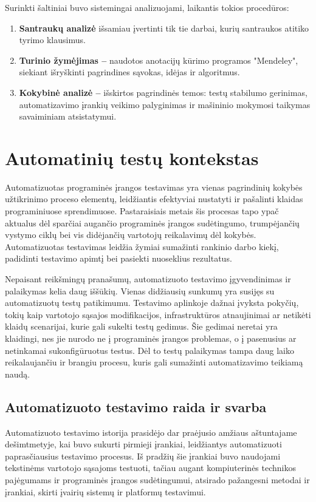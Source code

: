 \documentclass[
]{VUMIFPSkursinis}
\begin{document}
Surinkti šaltiniai buvo sistemingai analizuojami, laikantis tokios procedūros:

\begin{enumerate}
    \item \textbf{Santraukų analizė}  išsamiau įvertinti tik tie darbai, kurių santraukos atitiko tyrimo klausimus.
    \item \textbf{Turinio žymėjimas –  } naudotos anotacijų kūrimo programos "Mendeley", siekiant išryškinti pagrindines sąvokas, idėjas ir algoritmus.
    \item \textbf{Kokybinė analizė –} išskirtos pagrindinės temos: testų stabilumo gerinimas, automatizavimo įrankių veikimo palyginimas ir mašininio mokymosi taikymas savaiminiam atsistatymui.
\end{enumerate}

\section{Automatinių testų kontekstas}

Automatizuotas programinės įrangos testavimas yra vienas pagrindinių kokybės užtikrinimo proceso elementų, leidžiantis efektyviai nustatyti ir pašalinti klaidas programiniuose sprendimuose. Pastaraisiais metais šis procesas tapo ypač aktualus dėl sparčiai augančio programinės įrangos sudėtingumo, trumpėjančių vystymo ciklų bei vis didėjančių vartotojų reikalavimų dėl kokybės. Automatizuotas testavimas leidžia žymiai sumažinti rankinio darbo kiekį, padidinti testavimo apimtį bei pasiekti nuoseklius rezultatus.

Nepaisant reikšmingų pranašumų, automatizuoto testavimo įgyvendinimas ir palaikymas kelia daug iššūkių. Vienas didžiausių sunkumų yra susijęs su automatizuotų testų patikimumu. Testavimo aplinkoje dažnai įvyksta pokyčių, tokių kaip vartotojo sąsajos modifikacijos, infrastruktūros atnaujinimai ar netikėti klaidų scenarijai, kurie gali sukelti testų gedimus. Šie gedimai neretai yra klaidingi, nes jie nurodo ne į programinės įrangos problemas, o į pasenusius ar netinkamai sukonfigūruotus testus. Dėl to testų palaikymas tampa daug laiko reikalaujančiu ir brangiu procesu, kuris gali sumažinti automatizavimo teikiamą naudą.

\subsection{Automatizuoto testavimo raida ir svarba}

Automatizuoto testavimo istorija prasidėjo dar praėjusio amžiaus aštuntajame dešimtmetyje, kai buvo sukurti pirmieji įrankiai, leidžiantys automatizuoti paprasčiausius testavimo procesus. Iš pradžių šie įrankiai buvo naudojami tekstinėms vartotojo sąsajoms testuoti, tačiau augant kompiuterinės technikos pajėgumams ir programinės įrangos sudėtingumui, atsirado pažangesni metodai ir įrankiai, skirti įvairių sistemų ir platformų testavimui.
\end{document}
